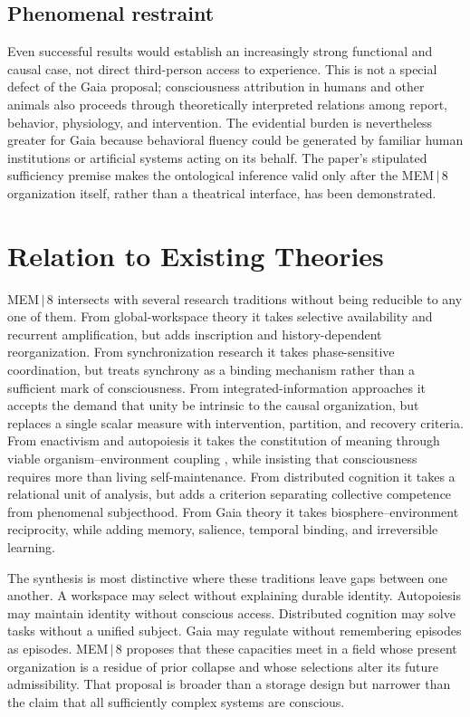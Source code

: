 \documentclass[11pt]{article}
\begin{document}
\subsection{Phenomenal restraint}

Even successful results would establish an increasingly strong functional and causal case, not direct third-person access to experience. This is not a special defect of the Gaia proposal; consciousness attribution in humans and other animals also proceeds through theoretically interpreted relations among report, behavior, physiology, and intervention. The evidential burden is nevertheless greater for Gaia because behavioral fluency could be generated by familiar human institutions or artificial systems acting on its behalf. The paper's stipulated sufficiency premise makes the ontological inference valid only after the MEM\,$|$\,8 organization itself, rather than a theatrical interface, has been demonstrated.

\section{Relation to Existing Theories}

MEM\,$|$\,8 intersects with several research traditions without being reducible to any one of them. From global-workspace theory it takes selective availability and recurrent amplification, but adds inscription and history-dependent reorganization. From synchronization research it takes phase-sensitive coordination, but treats synchrony as a binding mechanism rather than a sufficient mark of consciousness. From integrated-information approaches it accepts the demand that unity be intrinsic to the causal organization, but replaces a single scalar measure with intervention, partition, and recovery criteria. From enactivism and autopoiesis it takes the constitution of meaning through viable organism--environment coupling \cite{thompson2004}, while insisting that consciousness requires more than living self-maintenance. From distributed cognition it takes a relational unit of analysis, but adds a criterion separating collective competence from phenomenal subjecthood. From Gaia theory it takes biosphere--environment reciprocity, while adding memory, salience, temporal binding, and irreversible learning.

The synthesis is most distinctive where these traditions leave gaps between one another. A workspace may select without explaining durable identity. Autopoiesis may maintain identity without conscious access. Distributed cognition may solve tasks without a unified subject. Gaia may regulate without remembering episodes as episodes. MEM\,$|$\,8 proposes that these capacities meet in a field whose present organization is a residue of prior collapse and whose selections alter its future admissibility. That proposal is broader than a storage design but narrower than the claim that all sufficiently complex systems are conscious.
\end{document}
